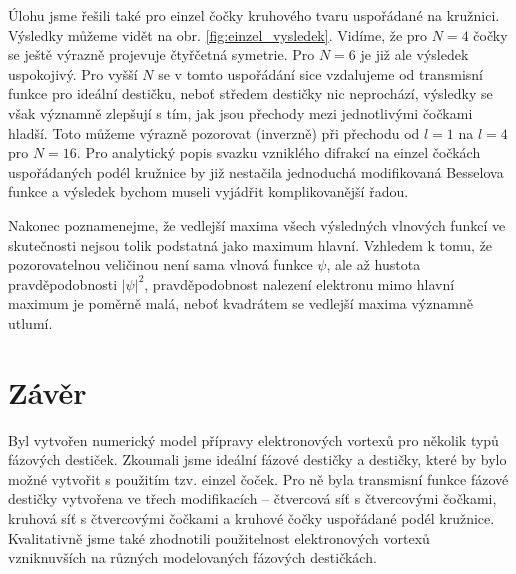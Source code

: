 \documentclass[a4paper,11pt]{article}
\begin{document}
\begin{multicols}{2}
Úlohu jsme řešili také pro einzel čočky kruhového tvaru uspořádané na kružnici. Výsledky můžeme vidět na obr. \ref{fig:einzel_vysledek}. Vidíme, že pro $N = 4$ čočky se ještě výrazně projevuje čtyřčetná symetrie. Pro $N = 6$ je již ale výsledek uspokojivý. Pro vyšší $N$ se v tomto uspořádání sice vzdalujeme od transmisní funkce pro ideální destičku, neboť středem destičky nic neprochází, výsledky se však významně zlepšují s tím, jak jsou přechody mezi jednotlivými čočkami hladší. Toto můžeme výrazně pozorovat (inverzně) při přechodu od $l=1$ na $l=4$ pro $N=16$. Pro analytický popis svazku vzniklého difrakcí na einzel čočkách uspořádaných podél kružnice by již nestačila jednoduchá modifikovaná Besselova funkce a výsledek bychom museli vyjádřit komplikovanější řadou.

Nakonec poznamenejme, že vedlejší maxima všech výsledných vlnových funkcí ve skutečnosti nejsou tolik podstatná jako maximum hlavní. Vzhledem k tomu, že pozorovatelnou veličinou není sama vlnová funkce $\psi$, ale až hustota pravděpodobnosti $|\psi|^2$, pravděpodobnost nalezení elektronu mimo hlavní maximum je poměrně malá, neboť kvadrátem se vedlejší maxima významně utlumí.





\section*{Závěr}

Byl vytvořen numerický model přípravy elektronových vortexů pro několik typů fázových destiček. Zkoumali jsme ideální fázové destičky a destičky, které by bylo možné vytvořit s použitím tzv. einzel čoček. Pro ně byla transmisní funkce fázové destičky vytvořena ve třech modifikacích -- čtvercová síť s čtvercovými čočkami, kruhová síť s čtvercovými čočkami a kruhové čočky uspořádané podél kružnice. Kvalitativně jsme také zhodnotili použitelnost elektronových vortexů vzniknuvších na různých modelovaných fázových destičkách.




\end{multicols}
\end{document}
